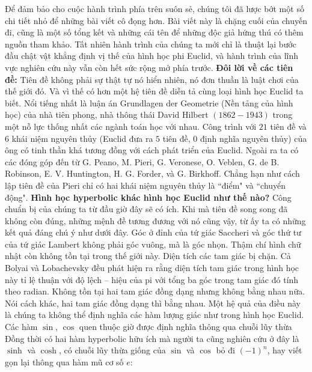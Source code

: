 \begin{multicols}{2}
	Để đảm bảo cho cuộc hành trình phía trên suôn sẻ, chúng tôi đã lược bớt một số chi tiết nhỏ để những bài viết cô đọng hơn. Bài viết này là chặng cuối của chuyến đi, cũng là một số tổng kết và những cái tên để những độc giả hứng thú có thêm nguồn tham khảo. Tất nhiên hành trình của chúng ta mới chỉ là thuật lại bước đầu chật vật khẳng định vị thế của hình học phi Euclid, và hành trình của lĩnh vực nghiên cứu này vẫn còn hết sức rộng mở phía trước.
	\vskip 0.1cm
	\textbf{\color{lichsutoanhoc}Đôi lời về các tiên đề:}
	\vskip 0.1cm
	Tiên đề không phải sự thật tự nó hiển nhiên, nó đơn thuần là luật chơi của thế giới đó. Và vì thế có hơn một hệ tiên đề diễn tả cùng loại hình học Euclid ta biết. Nổi tiếng nhất là luận án Grundlagen der Geometrie (Nền tảng của hình học) của nhà tiên phong, nhà thông thái David Hilbert $(1862-1943)$ trong một nỗ lực thống nhất các ngành toán học với nhau. Công trình với $21$ tiên đề và $6$ khái niệm nguyên thủy (Euclid đưa ra $5$ tiên đề, $0$ định nghĩa nguyên thủy) của ông có tinh thần khá tương đồng với cách phát triển của Euclid. 
	Ngoài ra ta có các đóng góp đến từ G. Peano, M. Pieri, G. Veronese, O. Veblen, G. de B. Robinson, E. V. Huntington, H. G. Forder, và G. Birkhoff. Chẳng hạn như cách lập tiên đề của Pieri chỉ có hai khái niệm nguyên thủy là ``điểm" và ``chuyển động".
	\vskip 0.1cm
	\textbf{\color{lichsutoanhoc}Hình học hyperbolic khác hình học Euclid như thế nào?}
	\vskip 0.1cm
	Công chuẩn bị của chúng ta từ đầu giờ đây sẽ có ích. Khi mà tiên đề song song đã không còn đúng, những mệnh đề tương đương với nó cũng vậy, từ ấy ta có những kết quả đáng chú ý như dưới đây. 
	Góc ở đỉnh của tứ giác Saccheri và góc thứ tư của tứ giác Lambert không phải góc vuông, mà là góc nhọn. Thậm chí hình chữ nhật còn không tồn tại trong thế giới này. Diện tích các tam giác bị chặn. Cả Bolyai và Lobachevsky đều phát hiện ra rằng diện tích tam giác trong hình học này tỉ lệ thuận với độ lệch -- hiệu của pi với tổng ba góc trong tam giác đó tính theo radian. Không tồn tại hai tam giác đồng dạng nhưng không bằng nhau nữa. Nói cách khác, hai tam giác đồng dạng thì bằng nhau. 
	\vskip 0.1cm
	Một hệ quả của điều này là chúng ta không thể định nghĩa các hàm lượng giác như trong hình học Euclid. Các hàm $\sin$, $\cos$ quen thuộc giờ được định nghĩa thông qua chuỗi lũy thừa Đồng thời có hai hàm hyperbolic hữu ích mà người ta cũng nghiên cứu ở đây là $\sinh$ và $\cosh$, có chuỗi lũy thừa giống của $\sin$ và $\cos$ bỏ đi $(-1)^n$, hay viết gọn lại thông qua hàm mũ cơ số $e$: 
	\begin{align*}

\end{align*}
\end{multicols}
